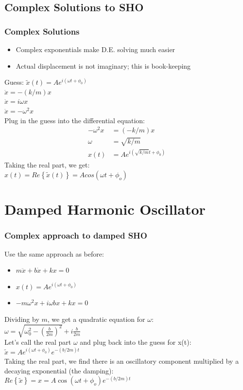 \documentclass[pdf,hideothersubsections]{beamer}
\begin{document}
\subsection{Complex Solutions to SHO}
\begin{frame}
\frametitle{Complex Solutions}
\begin{itemize}
\item Complex exponentials make D.E. solving much easier
\pause
\item Actual displacement is not imaginary; this is book-keeping
\pause
\end{itemize}
Guess: $\tilde{x}(t) = A e^{i (\omega t + \phi_0)}$ \\
\pause
$\ddot{x} = -(k/m) x$ \\
\pause
$\dot{x} = i \omega x$ \\
\pause
$\ddot{x} = -\omega^2 x$ \\
Plug in the guess into the differential equation:
\begin{align*}
-\omega^2 x &= (-k/m) x \\
\omega &= \sqrt{k/m} \\
x(t) &= A e^{i (\sqrt{k/m} t + \phi_0)}
\end{align*}
\pause
Taking the real part, we get: \\
\pause
$x(t) = Re\left\{\tilde{x}(t)\right\} = A cos(\omega t + \phi_o)$

\end{frame}

\section{Damped Harmonic Oscillator}
\begin{frame}
\frametitle{Complex approach to damped SHO}
Use the same approach as before:
\begin{itemize}
\item $m \ddot{x} + b \dot{x} + k x = 0$
\pause
\item $x(t) = A e^{i (\omega t + \phi_0)}$
\pause
\item $-m \omega^2 x + i \omega b x + k x = 0$
\end{itemize}
\pause
Dividing by $m$, we get a quadratic equation for $\omega$: \\
\pause
$\omega = \sqrt{\omega_0^2 - (\frac{b}{2 m})^2} + i \frac{b}{2 m}$ \\
\pause
Let's call the real part $\omega$ and plug back into the guess for x(t):
\pause
$\tilde{x} = A e^{i (\omega t + \phi_0)} e^{-(b/2 m) t}$\\
\pause
Taking the real part, we find there is an oscillatory component multiplied by a decaying exponential (the damping): \\
\pause
$Re\left\{\tilde{x}\right\} = x = A \cos(\omega t + \phi_o) e^{-(b/2 m) t}$

\end{frame}
\end{document}
